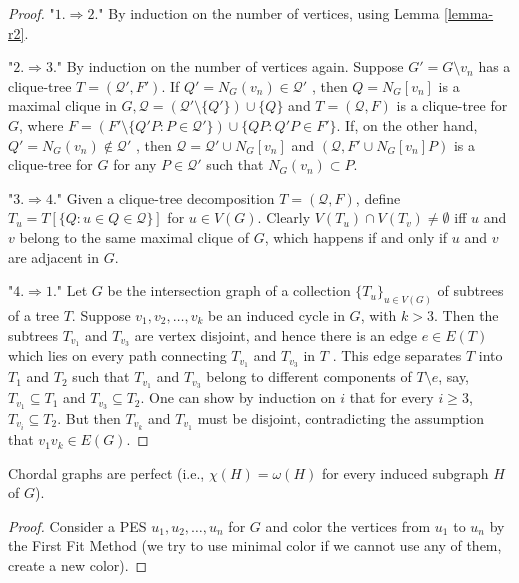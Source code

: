 \begin{proof}
	"$1. \Rightarrow 2.$" By induction on the number of vertices, using Lemma \ref{lemma-r2}.
	
	"$2. \Rightarrow 3.$" By induction on the number of vertices again. Suppose $G' = G \setminus v_n$ has a clique-tree	$T = (\mathcal{Q}' , F')$. If $Q' = N_G (v_n) \in \mathcal{Q}'$ , then $Q = N_G [v_n]$ is a maximal clique in $G, \mathcal{Q} = (\mathcal{Q}' \setminus \{Q'\}) \cup \{Q\}$ and $T = (\mathcal{Q}, F)$ is a clique-tree for $G$, where $F = (F' \setminus \{Q' P : P \in \mathcal{Q}'\}) \cup \{QP : Q'P \in F'\}$. If, on the other hand, $Q' = N_G(v_n) \notin \mathcal{Q}'$ , then $\mathcal{Q} = \mathcal{Q}' \cup N_G [v_n]$ and $(\mathcal{Q}, F' \cup N_G [v_n]P)$ is a clique-tree for $G$ for any $P \in \mathcal{Q}'$ such that $N_G (v_n) \subset P$.
	
	"$3. \Rightarrow 4.$" Given a clique-tree decomposition $T = (\mathcal{Q}, F)$, define $T_u = T [\{Q : u \in Q \in \mathcal{Q}\}]$ for $u \in V(G)$. Clearly $V(T_u) \cap V(T_v) \neq \emptyset$ iff $u$ and $v$ belong to the same maximal clique of $G$, which happens if and only if $u$ and $v$ are adjacent in $G$.
	
	"$4. \Rightarrow 1.$" Let $G$ be the intersection graph of a collection $\{T_u\}_{u \in V(G)}$ of subtrees of a tree $T$. Suppose $v_1, v_2, \dots, v_k$ be an induced cycle in $G$, with $k > 3$. Then the subtrees $T_{v_1}$ and $T_{v_3}$ are vertex disjoint, and hence there is an edge $e \in E(T)$ which lies on every path connecting $T_{v_1}$ and $T_{v_3}$ in $T$ . This edge separates $T$ into $T_1$ and $T_2$ such that $T_{v_1}$ and $T_{v_3}$ belong to different components of $T \setminus e$, say, $T_{v_1} \subseteq T_1$ and $T_{v_3} \subseteq T_2$. One can show by induction on $i$ that for every $i \geq 3$, $T_{v_i} \subseteq T_2$. But then $T_{v_k}$ and $T_{v_1}$ must be disjoint, contradicting the assumption that $v_1 v_k \in E(G)$.
\end{proof}

\begin{cor}
	Chordal graphs are perfect (i.e., $\chi(H) = \omega(H)$ for every induced subgraph $H$ of $G$).
\end{cor}

\begin{proof}
	Consider a PES $u_1, u_2, \dots, u_n$ for $G$ and color the vertices from $u_1$ to $u_n$ by the First Fit Method (we try to use minimal color if we cannot use any of them, create a new color).
\end{proof}